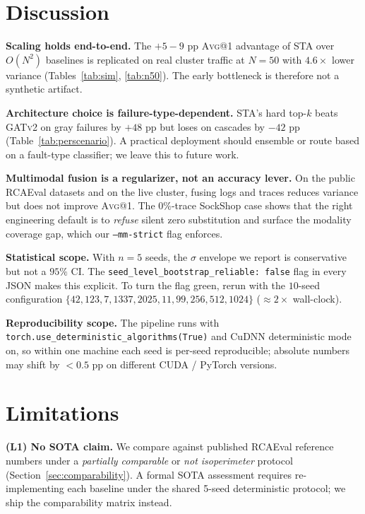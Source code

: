 \documentclass[11pt,a4paper]{article}
\makeatletter
\newcommand{\Avg}[1]{\textsc{Avg}@{#1}}
\newcommand{\STA}{\textsc{STA}}
\newcommand{\GATv}{\textsc{GATv2}}
\makeatother
\begin{document}
\section{Discussion}
\label{sec:discussion}

\textbf{Scaling holds end-to-end.} The $+5{-}9$ pp \Avg{1} advantage of
\STA{} over $O(N^2)$ baselines is replicated on real cluster traffic at
$N{=}50$ with $4.6\times$ lower variance (Tables~\ref{tab:sim}, \ref{tab:n50}).
The early bottleneck is therefore not a synthetic artifact.

\textbf{Architecture choice is failure-type-dependent.} \STA{}'s hard top-$k$
beats \GATv{} on gray failures by $+48$ pp but loses on cascades by $-42$ pp
(Table~\ref{tab:perscenario}). A practical deployment should ensemble or
route based on a fault-type classifier; we leave this to future work.

\textbf{Multimodal fusion is a regularizer, not an accuracy lever.} On the
public RCAEval datasets and on the live cluster, fusing logs and traces
reduces variance but does not improve \Avg{1}. The
$0\%$-trace SockShop case shows that the right engineering default is to
\emph{refuse} silent zero substitution and surface the modality coverage
gap, which our \texttt{--mm-strict} flag enforces.

\textbf{Statistical scope.} With $n{=}5$ seeds, the $\sigma$ envelope we
report is conservative but not a $95\%$ CI. The
\texttt{seed\_level\_bootstrap\_reliable: false} flag in every JSON makes
this explicit. To turn the flag green, rerun with the $10$-seed configuration
$\{42, 123, 7, 1337, 2025, 11, 99, 256, 512, 1024\}$ ($\approx 2\times$
wall-clock).

\textbf{Reproducibility scope.} The pipeline runs with
\texttt{torch.use\_deterministic\_algorithms(True)} and CuDNN deterministic
mode on, so within one machine each seed is per-seed reproducible; absolute
numbers may shift by $<0.5$ pp on different CUDA / PyTorch versions.

\section{Limitations}

\textbf{(L1) No SOTA claim.} We compare against published RCAEval reference
numbers under a \emph{partially comparable} or \emph{not isoperimeter}
protocol (Section~\ref{sec:comparability}). A formal SOTA assessment requires
re-implementing each baseline under the shared 5-seed deterministic protocol;
we ship the comparability matrix instead.
\end{document}
